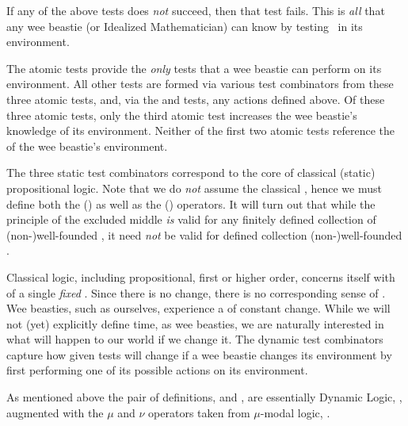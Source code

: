 \stopitemize

\stopitemize

If any of the above tests does \emph{not} succeed, then that test fails. 
This is \emph{all} that any wee beastie (or Idealized Mathematician) can 
know by testing \lols\ in its environment. 

\stopDefinition

\startMMundi

The atomic tests provide the \emph{only} tests that a wee beastie can 
perform \emph{} on its environment. All other tests are 
formed via various test combinators from these three atomic tests, and, 
via the  and  tests, any actions 
defined above. Of these three atomic tests, only the third atomic test 
increases the wee beastie's knowledge of its environment. Neither of the 
first two atomic tests reference the  of the wee beastie's 
environment. 

The three static test combinators correspond to the core of classical 
(static) propositional logic. Note that we do \emph{not} assume the 
classical , hence we must define 
both the   () as well as the 
  () operators. It will turn 
out that while the principle of the excluded middle \emph{is} valid for 
any finitely defined collection of (non-)well-founded \lols, it need 
\emph{not} be valid for  defined collection 
(non-)well-founded \lols. 

Classical logic, including propositional, first or higher order, concerns 
itself with  of a single \emph{fixed}  
. Since there is no change, there is no corresponding sense 
of . Wee beasties, such as ourselves, experience a 
 of constant change. While we will not (yet) explicitly 
define time, as wee beasties, we are naturally interested in what will 
happen to our world if we change it. The dynamic test combinators capture 
how given tests will change if a wee beastie changes its environment by 
first performing one of its possible actions on its environment. 

As mentioned above the pair of definitions, \in[beastieActions] and 
\in[beastieTests], are essentially Dynamic Logic, 
\cite{harelKozenTiuryn2000dynamicLogic}, augmented with the $\mu$ and 
$\nu$ operators taken from $\mu$-modal logic, 
\cite{demriGorankoLange2016temporalLogics}. 

